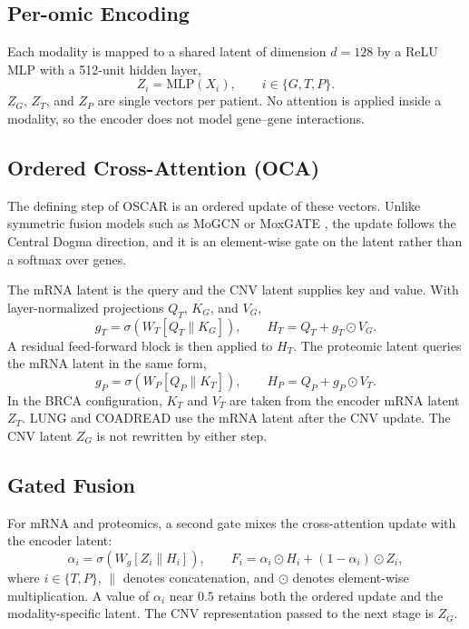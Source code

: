 \documentclass[lettersize,journal]{IEEEtran}
\begin{document}
\subsection{Per-omic Encoding}
Each modality is mapped to a shared latent of dimension $d=128$ by a ReLU MLP with a 512-unit hidden layer,
\begin{equation}
    Z_i = \mathrm{MLP}(X_i), \qquad i \in \{G, T, P\}.
\end{equation}
$Z_G$, $Z_T$, and $Z_P$ are single vectors per patient. No attention is applied inside a modality, so the encoder does not model gene--gene interactions.

\subsection{Ordered Cross-Attention (OCA)}
The defining step of OSCAR is an ordered update of these vectors. Unlike symmetric fusion models such as MoGCN \cite{MoGCN2022} or MoxGATE \cite{MoxGATE2023}, the update follows the Central Dogma direction, and it is an element-wise gate on the latent rather than a softmax over genes.

The mRNA latent is the query and the CNV latent supplies key and value. With layer-normalized projections $Q_T$, $K_G$, and $V_G$,
\begin{equation}
    g_{T} = \sigma\!\left(W_{T}[Q_T \parallel K_G]\right), \qquad
    H_T = Q_T + g_{T} \odot V_G.
\end{equation}
A residual feed-forward block is then applied to $H_T$. The proteomic latent queries the mRNA latent in the same form,
\begin{equation}
    g_{P} = \sigma\!\left(W_{P}[Q_P \parallel K_T]\right), \qquad
    H_P = Q_P + g_{P} \odot V_T.
\end{equation}
In the BRCA configuration, $K_T$ and $V_T$ are taken from the encoder mRNA latent $Z_T$. LUNG and COADREAD use the mRNA latent after the CNV update. The CNV latent $Z_G$ is not rewritten by either step.

\subsection{Gated Fusion}
For mRNA and proteomics, a second gate mixes the cross-attention update with the encoder latent:
\begin{equation}
    \alpha_i = \sigma\!\left(W_g[Z_i \parallel H_i]\right), \qquad
    F_i = \alpha_i \odot H_i + (1-\alpha_i) \odot Z_i,
\end{equation}
where $i \in \{T, P\}$, $\parallel$ denotes concatenation, and $\odot$ denotes element-wise multiplication. A value of $\alpha_i$ near $0.5$ retains both the ordered update and the modality-specific latent. The CNV representation passed to the next stage is $Z_G$.
\end{document}
